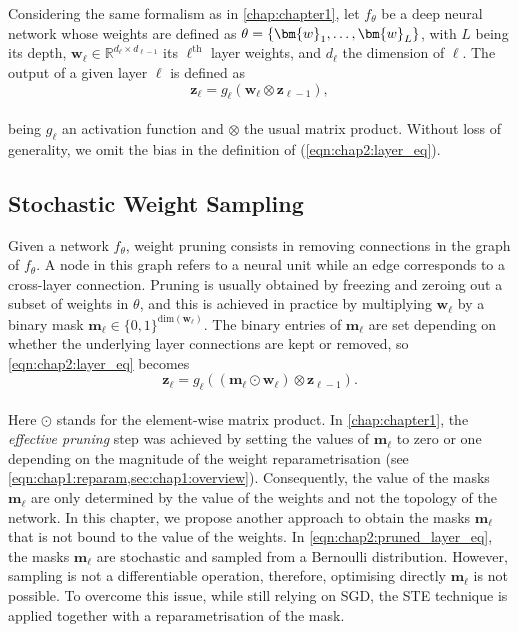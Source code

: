 Considering the same formalism as in \cref{chap:chapter1}, let $f_\theta$ be a
deep neural network whose weights are defined as $\theta =
  \left\{\bm{w}_1,\mathellipsis, \bm{w}_L \right\}$, with $L$ being its depth,
$\bm{w}_\ell \in \mathbb{R}^{d_{\ell} \times d_{\ell-1}}$ its $\ell^\textrm{th}$
layer weights, and $d_\ell$ the dimension of $\ell$. The output of a given layer
$\ell$ is defined as \\

\begin{equation}
  \label{eqn:chap2:layer_eq}
  \mathbf{z}_{\ell} = g_\ell(\bm{w}_\ell \otimes \mathbf{z}_{\ell-1}),
\end{equation}\\

being  $g_\ell$ an activation function and $\otimes$ the usual matrix product.
Without loss of generality, we omit the bias in the definition of
(\ref{eqn:chap2:layer_eq}).

\subsection{Stochastic Weight Sampling}
\label{sec:chap2:stochastic-sampling}
\indent Given a network $f_\theta$, weight pruning consists in removing
connections in the graph of $f_\theta$. A node in this graph refers to a neural
unit while an edge corresponds to a cross-layer connection. Pruning is usually
obtained by freezing and zeroing out  a subset of weights in $\theta$, and this
is achieved in practice by multiplying $\bm{w}_\ell$ by a binary mask
$\bm{m}_\ell \in \{ 0,1 \}^{\text{dim}(\bm{w}_\ell)}$. The binary entries of
$\bm{m}_\ell$ are set depending on whether the underlying layer connections are
kept or removed, so \cref{eqn:chap2:layer_eq} becomes\\

\begin{equation}
  \label{eqn:chap2:pruned_layer_eq}
  \mathbf{z}_{\ell} = g_\ell( (\bm{m}_\ell \odot \bm{w}_\ell ) \otimes \mathbf{z}_{\ell-1} ).
\end{equation}\\

Here $\odot$ stands for the element-wise matrix product. In
\cref{chap:chapter1}, the \emph{effective pruning} step was achieved by setting
the values of $\bm{m}_\ell$ to zero or one depending on the magnitude of the
weight reparametrisation (see \cref{eqn:chap1:reparam,sec:chap1:overview}).
Consequently, the value of the masks $\bm{m}_\ell$ are only determined by the
value of the weights and not the topology of the network. In this chapter, we
propose another approach to obtain the masks $\bm{m}_\ell$ that is not bound to
the value of the weights. In \cref{eqn:chap2:pruned_layer_eq}, the masks
$\bm{m}_\ell$ are stochastic and sampled from a Bernoulli distribution. However,
sampling is not a differentiable operation, therefore, optimising directly
${\bm{m}_\ell}$ is not possible. To overcome this issue, while still relying on
\ac{SGD}, the \acf{STE} technique is applied together with a reparametrisation
of the mask.\\

